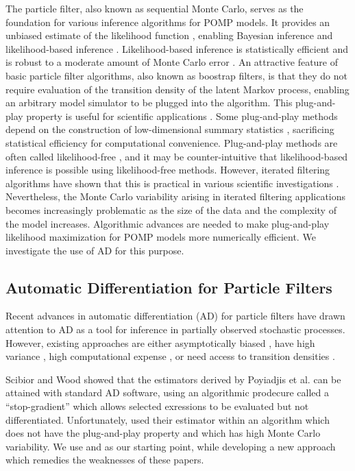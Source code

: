 \documentclass[9pt,twocolumn,twoside]{pnas-new}
\begin{document}
The particle filter, also known as sequential Monte Carlo, serves as the foundation for various inference algorithms for POMP models.
It provides an unbiased estimate of the likelihood function  \cite{delMoral04}, enabling Bayesian inference \cite{andrieu10,chopin13} and likelihood-based inference \citep{ionides06-pnas,ionides15}.
Likelihood-based inference is statistically efficient \cite{pawitan01} and is robust to a moderate amount of Monte Carlo error \cite{ionides17,ning21}.
An attractive feature of basic particle filter algorithms, also known as boostrap filters, is that they do not require evaluation of the transition density of the latent Markov process, enabling an arbitrary model simulator to be plugged into the algorithm.
This plug-and-play property is useful for scientific applications \cite{he10}.
Some plug-and-play methods depend on the construction of low-dimensional summary statistics \cite{wood10,toni09}, sacrificing statistical efficiency for computational convenience.
Plug-and-play methods are often called likelihood-free \cite{owen15}, and it may be counter-intuitive that likelihood-based inference is possible using likelihood-free methods. 
However, iterated filtering algorithms have shown that this is practical in various scientific investigations \cite{king08,blake14,pons-salort18,subramanian21,fox22,drake23}.
Nevertheless, the Monte Carlo variability arising in iterated filtering applications becomes increasingly problematic as the size of the data and the complexity of the model increases.
Algorithmic advances are needed to make plug-and-play likelihood maximization for POMP models more numerically efficient.
We investigate the use of AD for this purpose.

\subsection{Automatic Differentiation for Particle Filters}

Recent advances in automatic differentiation (AD) for particle filters \cite{naesseth18, jonschkowski18, corenflos21, scibior21, singh22} have drawn attention to AD as a tool for inference in partially observed stochastic processes. However, existing approaches are either asymptotically biased \cite{naesseth18, jonschkowski18}, have high variance \cite{poyiadjis11, scibior21}, high computational expense \cite{corenflos21, chen24}, or need access to transition densities \cite{poyiadjis11, scibior21, singh22, chen24}.

Scibior and Wood \cite{scibior21} showed that the estimators derived by Poyiadjis et al. \cite{poyiadjis11} can be attained with standard AD software, using an algorithmic prodecure called a ``stop-gradient'' which allows selected exressions to be evaluated but not differentiated.
Unfortunately, \cite{scibior21} used their estimator within an algorithm which does not have the plug-and-play property and which has high Monte Carlo variability.
We use \cite{scibior21} and \cite{poyiadjis11} as our starting point, while developing a new approach which remedies the weaknesses of these papers.
\end{document}
